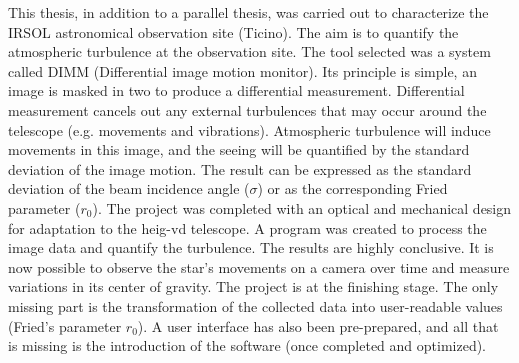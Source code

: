% 
% 
% 
% 
% 
% 
% 
% 

This thesis, in addition to a parallel thesis, was carried out to characterize the IRSOL astronomical observation site (Ticino).
The aim is to quantify the atmospheric turbulence at the observation site.
\bigbreak
The tool selected was a system called DIMM (Differential image motion monitor).
Its principle is simple, an image is masked in two to produce a differential measurement.\newline
Differential measurement cancels out any external turbulences that may occur around the telescope (e.g. movements and vibrations).
\bigbreak
Atmospheric turbulence will induce movements in this image, and the seeing will be quantified by the standard deviation of the image motion.
The result can be expressed as the standard deviation of the beam incidence angle ($\sigma$) or as the corresponding Fried parameter ($r_0$).
\bigbreak
The project was completed with an optical and mechanical design for adaptation to the \Gls{heig-vd} telescope.
A program was created to process the image data and quantify the turbulence.
\bigbreak
The results are highly conclusive. It is now possible to observe the star's movements on a camera over time and
measure variations in its center of gravity.
The project is at the finishing stage. The only missing part is the transformation of the collected data
into user-readable values (Fried's parameter $r_0$).
\newline
A user interface has also been pre-prepared, and all that is missing is the introduction of the software (once completed and optimized).